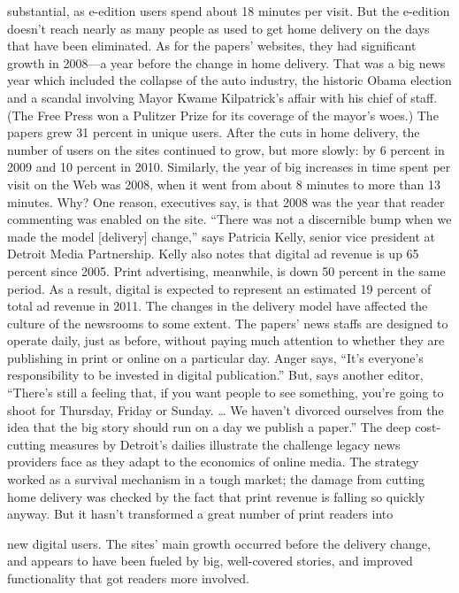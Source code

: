 substantial, as e-edition users spend about 18 minutes per visit. But the e-edition
doesn't reach nearly as many people as used to get home delivery on the days
that have been eliminated.
As for the papers' websites, they had significant growth in 2008—a year before
the change in home delivery. That was a big news year which included the collapse
of the auto industry, the historic Obama election and a scandal involving Mayor
Kwame Kilpatrick's affair with his chief of staff. (The Free Press won a Pulitzer
Prize for its coverage of the mayor's woes.) The papers grew 31 percent in unique
users. After the cuts in home delivery, the number of users on the sites continued to
grow, but more slowly: by 6 percent in 2009 and 10 percent in 2010.
Similarly, the year of big increases in time spent per visit on the Web was 2008,
when it went from about 8 minutes to more than 13 minutes. Why? One reason,
executives say, is that 2008 was the year that reader commenting was enabled on
the site. ``There was not a discernible bump when we made the model [delivery]
change,'' says Patricia Kelly, senior vice president at Detroit Media Partnership.
Kelly also notes that digital ad revenue is up 65 percent since 2005. Print advertising,
meanwhile, is down 50 percent in the same period. As a result, digital is
expected to represent an estimated 19 percent of total ad revenue in 2011.
The changes in the delivery model have affected the culture of the newsrooms
to some extent. The papers' news staffs are designed to operate daily, just as before,
without paying much attention to whether they are publishing in print or
online on a particular day. Anger says, ``It's everyone's responsibility to be invested
in digital publication.'' But, says another editor, ``There's still a feeling that, if you
want people to see something, you're going to shoot for Thursday, Friday or
Sunday. … We haven't divorced ourselves from the idea that the big story should
run on a day we publish a paper.''
The deep cost-cutting measures by Detroit's dailies illustrate the challenge
legacy news providers face as they adapt to the economics of online media. The
strategy worked as a survival mechanism in a tough market; the damage from
cutting home delivery was checked by the fact that print revenue is falling so
quickly anyway. But it hasn't transformed a great number of print readers into

new digital users. The sites' main growth occurred before the delivery change,
and appears to have been fueled by big, well-covered stories, and improved functionality
that got readers more involved.

